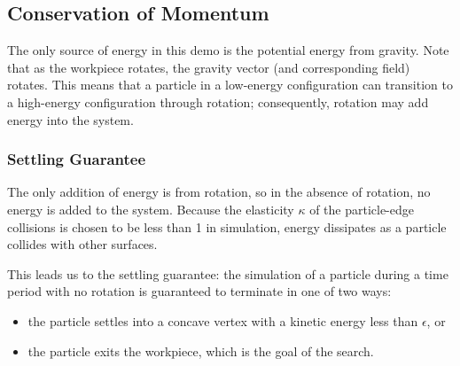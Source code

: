 	\subsection{Conservation of Momentum}

		The only source of energy in this demo is the potential energy from gravity. Note that as the workpiece rotates, the gravity vector (and corresponding field) rotates. This means that a particle in a low-energy configuration can transition to a high-energy configuration through rotation; consequently, rotation may add energy into the system.

		\subsubsection{Settling Guarantee}

		The only addition of energy is from rotation, so in the absence of rotation, no energy is added to the system. Because the elasticity  $\kappa$ of the particle-edge collisions is chosen to be less than 1 in simulation, energy dissipates as a particle collides with other surfaces.

		This leads us to the settling guarantee: the simulation of a particle during a time period with no rotation is guaranteed to terminate in one of two ways:

\begin{itemize}
\item the particle settles into a concave vertex with a kinetic energy less than $\epsilon$, or
\item the particle exits the workpiece, which is the goal of the search.
\end{itemize}

